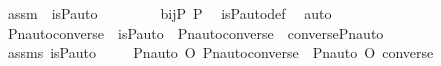 \begin{isabellebody}
\ assm\ {\isacharcolon}{\kern0pt}\ {\isachardoublequoteopen}is{\isacharunderscore}{\kern0pt}P{\isacharunderscore}{\kern0pt}auto{\isacharparenleft}{\kern0pt}{\isasympi}{\isacharparenright}{\kern0pt}{\isachardoublequoteclose}\ \isanewline
\ \ \isamarkupfalse%
\ \isamarkupfalse%
\ {\isachardoublequoteopen}{\isasympi}\ {\isasymin}\ bij{\isacharparenleft}{\kern0pt}P{\isacharcomma}{\kern0pt}\ P{\isacharparenright}{\kern0pt}{\isachardoublequoteclose}\ \isamarkupfalse%
\ is{\isacharunderscore}{\kern0pt}P{\isacharunderscore}{\kern0pt}auto{\isacharunderscore}{\kern0pt}def\ \isamarkupfalse%
\ auto\ \isanewline
{}\isamarkupfalse%
%
\endisatagproof
{\isafoldproof}%
%
\isadelimproof
\isanewline
%
\endisadelimproof
\isanewline
{}\isamarkupfalse%
\ Pn{\isacharunderscore}{\kern0pt}auto{\isacharunderscore}{\kern0pt}converse\ {\isacharcolon}{\kern0pt}\ {\isachardoublequoteopen}is{\isacharunderscore}{\kern0pt}P{\isacharunderscore}{\kern0pt}auto{\isacharparenleft}{\kern0pt}{\isasympi}{\isacharparenright}{\kern0pt}\ {\isasymLongrightarrow}\ Pn{\isacharunderscore}{\kern0pt}auto{\isacharparenleft}{\kern0pt}converse{\isacharparenleft}{\kern0pt}{\isasympi}{\isacharparenright}{\kern0pt}{\isacharparenright}{\kern0pt}\ {\isacharequal}{\kern0pt}\ converse{\isacharparenleft}{\kern0pt}Pn{\isacharunderscore}{\kern0pt}auto{\isacharparenleft}{\kern0pt}{\isasympi}{\isacharparenright}{\kern0pt}{\isacharparenright}{\kern0pt}{\isachardoublequoteclose}\ \isanewline
%
\isadelimproof
%
\endisadelimproof
%
\isatagproof
{}\isamarkupfalse%
\ {\isacharminus}{\kern0pt}\ \isanewline
\ \ \isamarkupfalse%
\ assms{\isacharcolon}{\kern0pt}\ {\isachardoublequoteopen}is{\isacharunderscore}{\kern0pt}P{\isacharunderscore}{\kern0pt}auto{\isacharparenleft}{\kern0pt}{\isasympi}{\isacharparenright}{\kern0pt}{\isachardoublequoteclose}\ \isanewline
\ \ \isamarkupfalse%
\ {\isachardoublequoteopen}Pn{\isacharunderscore}{\kern0pt}auto{\isacharparenleft}{\kern0pt}{\isasympi}{\isacharparenright}{\kern0pt}\ O\ Pn{\isacharunderscore}{\kern0pt}auto{\isacharparenleft}{\kern0pt}converse{\isacharparenleft}{\kern0pt}{\isasympi}{\isacharparenright}{\kern0pt}{\isacharparenright}{\kern0pt}\ {\isacharequal}{\kern0pt}\ Pn{\isacharunderscore}{\kern0pt}auto{\isacharparenleft}{\kern0pt}{\isasympi}\ O\ converse{\isacharparenleft}{\kern0pt}{\isasympi}{\isacharparenright}{\kern0pt}{\isacharparenright}{\kern0pt}{\isachardoublequoteclose}\ \isanewline
\ \ \ \ \isamarkupfalse%

\end{isabellebody}
